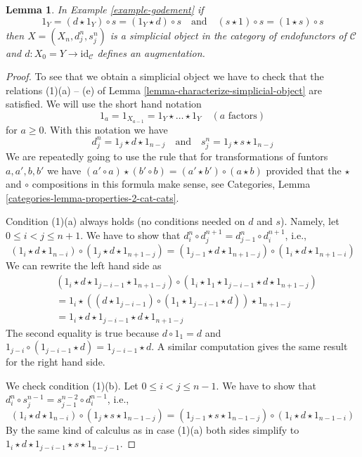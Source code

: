 \documentclass{stacks-project}
\theoremstyle{plain}
\newtheorem{lemma}[subsection]{Lemma}
\theoremstyle{definition}
\theoremstyle{remark}
\numberwithin{equation}{subsection}
\begin{document}
\begin{lemma}
\label{lemma-godement}
In Example \ref{example-godement} if
$$
1_Y = (d \star 1_Y) \circ s = (1_Y \star d) \circ s
\quad\text{and}\quad
(s \star 1) \circ s = (1 \star s) \circ s
$$
then $X = (X_n, d^n_j, s^n_j)$ is a simplicial object in the category
of endofunctors of $\mathcal{C}$ and $d : X_0 = Y \to \text{id}_\mathcal{C}$
defines an augmentation.
\end{lemma}

\begin{proof}
To see that we obtain a simplicial object we have to check that the
relations (1)(a) -- (e) of Lemma \ref{lemma-characterize-simplicial-object}
are satisfied. We will use the short hand notation
$$
1_a = 1_{X_{a - 1}} = 1_Y \star \ldots \star 1_Y \quad (a\text{ factors})
$$
for $a \geq 0$. With this notation we have
$$
d^n_j = 1_j \star d \star 1_{n - j}
\quad\text{and}\quad
s^n_j = 1_j \star s \star 1_{n - j}
$$
We are repeatedly going to use the rule that for transformations
of funtors $a, a', b, b'$ we have
$(a' \circ a) \star (b' \circ b) = (a' \star b') \circ (a \star b)$
provided that the $\star$ and $\circ$ compositions in this formula
make sense, see
Categories, Lemma \ref{categories-lemma-properties-2-cat-cats}.

\medskip\noindent
Condition (1)(a) always holds (no conditions needed on $d$ and $s$).
Namely, let $0 \leq i < j \leq n + 1$. We have to show that
$d^n_i \circ d^{n + 1}_j = d^n_{j - 1} \circ d^{n + 1}_i$, i.e.,
$$
(1_i \star d \star 1_{n - i}) \circ
(1_j \star d \star 1_{n + 1 - j}) =
(1_{j - 1} \star d \star 1_{n + 1 - j}) \circ
(1_i \star d \star 1_{n + 1 - i})
$$
We can rewrite the left hand side as
\begin{align*}
& (1_i \star d \star 1_{j - i - 1} \star 1_{n + 1 - j}) \circ
(1_i \star 1_1 \star 1_{j - i - 1} \star d \star 1_{n + 1 - j}) \\
& =
1_i \star
\left((d \star 1_{j - i - 1}) \circ
(1_1 \star 1_{j - i - 1} \star d)\right) \star 1_{n + 1 - j} \\
& =
1_i \star d \star 1_{j - i - 1} \star d \star 1_{n + 1 - j} 
\end{align*}
The second equality is true because $d \circ 1_1 = d$ and
$1_{j - i} \circ (1_{j - i - 1} \star d) = 1_{j - i - 1} \star d$.
A similar computation gives the same result for the right hand side.

\medskip\noindent
We check condition (1)(b). Let $0 \leq i < j \leq n - 1$. We have to show
that $d^n_i \circ s^{n - 1}_j = s^{n - 2}_{j - 1} \circ d^{n - 1}_i$, i.e.,
$$
(1_i \star d \star 1_{n - i}) \circ
(1_j \star s \star 1_{n - 1 - j}) =
(1_{j - 1} \star s \star 1_{n - 1 - j}) \circ
(1_i \star d \star 1_{n - 1 - i})
$$
By the same kind of calculus as in case (1)(a) both sides simplify
to $1_i \star d \star 1_{j - i - 1} \star s \star 1_{n - j - 1}$.


\end{proof}
\end{document}
